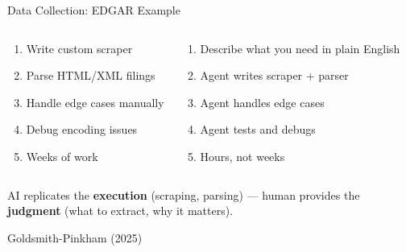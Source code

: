 \documentclass[aspectratio=169, 11pt]{beamer}
\newcommand{\emphgold}[1]{\alert{\textbf{#1}}}
\newcommand{\sourceref}[1]{\vspace{0.15cm}\hfill{\tiny\textcolor{medgray}{#1}}}
\begin{document}
\begin{frame}[shrink=3]{Data Collection: EDGAR Example}
\begin{columns}[T]
\begin{warningbox}
\begin{enumerate}
  \item Write custom scraper
  \item Parse HTML/XML filings
  \item Handle edge cases manually
  \item Debug encoding issues
  \item Weeks of work
\end{enumerate}
\end{warningbox}

\begin{keyinsight}
\begin{enumerate}
  \item Describe what you need in plain English
  \item Agent writes scraper + parser
  \item Agent handles edge cases
  \item Agent tests and debugs
  \item Hours, not weeks
\end{enumerate}
\end{keyinsight}
\end{columns}
\vspace{0.5cm}
\begin{center}
\small AI replicates the \emphgold{execution} (scraping, parsing) --- human provides the \emphgold{judgment} (what to extract, why it matters).
\end{center}
\sourceref{Goldsmith-Pinkham (2025)}
\end{frame}
\end{document}

